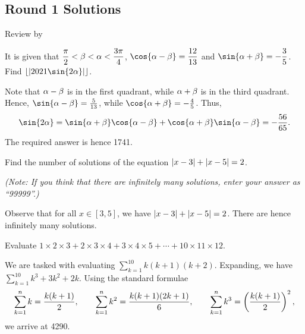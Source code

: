 \subsection{Round 1 Solutions}\label{S::2021-O-1}

\begin{resources}
    Review by 
\end{resources}

\begin{question}[1741]\label{Q::2021-O-1-1}
    It is given that $\dfrac\pi2 < \beta < \alpha < \dfrac{3\pi}{4}$, $\cos{\a - \b} = \dfrac{12}{13}$ and $\sin{\a + \b} = -\dfrac35$. Find $\floor{\abs{2021\sin{2\a}}}$.
\end{question}
\begin{solution*}
    Note that $\alpha - \beta$ is in the first quadrant, while $\alpha + \beta$ is in the third quadrant. Hence, $\sin{\a - \b} = \frac{5}{13}$, while $\cos{\a + \b} = -\frac45$. Thus, \[\sin{2\a} = \sin{\a + \b} \cos{\a - \b} + \cos{\a + \b} \sin{\a - \b} = -\frac{56}{65}.\] The required answer is hence 1741.
\end{solution*}

\begin{question}[99999]\label{Q::2021-O-1-2}
    Find the number of solutions of the equation $\left\lvert x - 3 \right\rvert + \left\lvert x - 5 \right\rvert = 2$.

    \noindent \textit{(Note: If you think that there are infinitely many solutions, enter your answer as ``99999''.)}
\end{question}
\begin{solution*}
    Observe that for all $x \in [3, 5]$, we have $\left\lvert x - 3 \right\rvert + \left\lvert x - 5 \right\rvert = 2$. There are hence infinitely many solutions.
\end{solution*}

\begin{question}[4290]\label{Q::2021-O-1-3}
    Evaluate $1 \times 2 \times 3 + 2 \times 3 \times 4 + 3 \times 4 \times 5 + \cdots + 10 \times 11 \times 12$.
\end{question}
\begin{solution*}
    We are tasked with evaluating $\displaystyle\sum_{k = 1}^{10} k(k+1)(k+2)$. Expanding, we have $\displaystyle\sum_{k = 1}^{10} k^3 + 3k^2 + 2k$. Using the standard formulae \[\sum_{k=1}^n k = \frac{k(k+1)}{2}, \qquad \sum_{k=1}^n k^2 = \frac{k(k+1)(2k+1)}{6}, \qquad \sum_{k=1}^n k^3 = \left( \frac{k(k+1)}{2} \right)^2,\] we arrive at 4290.
\end{solution*}

